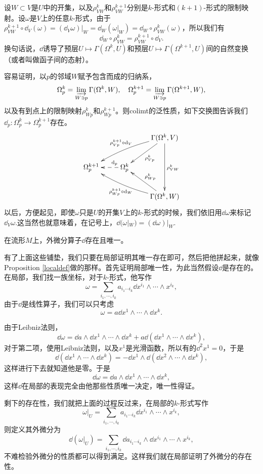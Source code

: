 \para 设$W\subset V$是$U$中的开集，以及$\rho^k_{VW}$和$\rho^{k+1}_{VW}$分别是$k$-形式和$(k+1)$-形式的限制映射。设$\omega$是$V$上的任意$k$-形式，由于$\rho^{k+1}_{VW}\circ \dd_V (\omega)=(\dd_V \omega)|_W=\dd_W (\omega|_W)=\dd_W \circ \rho^k_{VW}(\omega)$，所以我们有
\[
\dd_W\circ \rho^k_{VW}=\rho^{k+1}_{VW}\circ \dd_V.
\]
换句话说，$\dd$诱导了预层$U\mapsto \Gamma(\Omega^k,U)$和预层$U\mapsto \Gamma(\Omega^{k+1},U)$间的自然变换（或者叫做函子间的态射）。

\para 容易证明，以$p$的邻域$W$赋予包含而成的归纳系，
\[
	\Omega_p^k=\varinjlim_{W\ni p}\Gamma(\Omega^k,W),\quad \Omega_p^{k+1}=\varinjlim_{W\ni p}\Gamma(\Omega^{k+1},W),
\]
以及有到点上的限制映射$\rho^k_{Wp}$和$\rho^{k+1}_{Wp}$。则colimt的泛性质，如下交换图告诉我们$\dd_p:\Omega_p^k\to \Omega_p^{k+1}$存在。
\[
	\xymatrix{
	&&\ar[dl]^{\rho^k_{Vp}}\Gamma(\Omega^k,V)\ar[dd]^{\rho^k_{VW}}\ar@/_/[lld]_{\rho^{k+1}_{Vp}\circ \dd_V} \\
	\Omega_p^{k+1}&\ar@{-->}[l]_(0.3){\dd_p}\Omega_p^{k}&\\
	&&\ar[ul]_{\rho^k_{Wp}}\Gamma(\Omega^k,W)\ar@/^/[llu]^{\rho^{k+1}_{Wp}\circ \dd_W}
	}
\]
以后，方便起见，即使$\omega$只是$U$的开集$V$上的$k$-形式的时候，我们依旧用$\dd \omega$来标记$\dd_V \omega$.这当然也就意味着，在记号上，$\dd(\omega|_W)=(\dd\omega)|_W$.

\pro 在流形$M$上，外微分算子$\dd$存在且唯一。

\proof 有了上面这些铺垫，我们只要在局部证明其唯一存在即可，然后把他拼起来，就像Proposition \eqref{localdef}做的那样。首先证明局部唯一性，为此当然假设$\dd$是存在的。在局部，我们找一族坐标，对于$k$-形式，他写作
\[
	\omega=\sum_{i_1,\cdots ,i_k} a_{i_1\cdots i_k}\dd x^{i_{1}}\wedge\cdots\wedge x^{i_{k}},
\]
由于$\dd$是线性算子，我们可以只考虑
\[
	\omega=a\dd x^{1}\wedge\cdots\wedge \dd x^{k}.
\]

由于Leibniz法则，
\[
	\dd \omega=\dd a \wedge \dd x^{1}\wedge\cdots\wedge \dd x^{k}+a\dd(\dd x^{1}\wedge\cdots\wedge \dd x^{k}),
\]
对于第二项，使用Leibniz法则，以及$x^1$是光滑函数，所以有的$\dd^2 x^1=0$，于是
\[
	\dd(\dd x^{1}\wedge\cdots\wedge \dd x^{k})=-\dd x^{1}\wedge\dd(\dd x^{2}\wedge\cdots\wedge \dd x^{k}),
\]
这样进行下去就知道他是零。于是
\[
	\dd \omega=\dd a \wedge \dd x^{1}\wedge\cdots\wedge \dd x^{k},
\]
这样$\dd$在局部的表现完全由他那些性质唯一决定，唯一性得证。

剩下的存在性，我们就把上面的过程反过来，在局部的$k$-形式写作
\[
	\omega|_U=\sum_{i_1,\cdots ,i_k} a_{i_1\cdots i_k}\dd x^{i_{1}}\wedge\cdots\wedge x^{i_{k}},
\]
则定义其外微分为
\[
	\dd(\omega|_U)=\sum_{i_1,\cdots ,i_k} \dd a_{i_1\cdots i_k}\wedge\dd x^{i_{1}}\wedge\cdots\wedge x^{i_{k}},
\]
不难检验外微分的性质都可以得到满足。这样我们就在局部证明了外微分的存在性。

